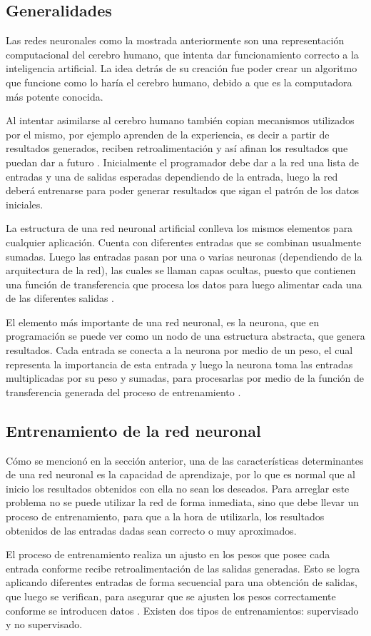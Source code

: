 \subsection{Generalidades}
\par
Las redes neuronales como la mostrada anteriormente son una representación computacional del cerebro humano, que intenta dar funcionamiento correcto a la inteligencia artificial. La idea detrás de su creación fue poder crear un algoritmo que funcione como lo haría el cerebro humano, debido a que es la computadora más potente conocida.
\par
Al intentar asimilarse al cerebro humano también copian mecanismos utilizados por el mismo, por ejemplo aprenden de la experiencia, es decir a partir de resultados generados, reciben retroalimentación y así afinan los resultados que puedan dar a futuro \cite{olabe_2008}. Inicialmente el programador debe dar a la red una lista de entradas y una de salidas esperadas dependiendo de la entrada, luego la red deberá entrenarse para poder generar resultados que sigan el patrón de los datos iniciales.
\par
La estructura de una red neuronal artificial conlleva los mismos elementos para cualquier aplicación. Cuenta con diferentes entradas que se combinan usualmente sumadas. Luego las entradas pasan por una o varias neuronas (dependiendo de la arquitectura de la red), las cuales se llaman capas ocultas, puesto que contienen una función de transferencia que procesa los datos para luego alimentar cada una de las diferentes salidas \cite{olabe_2008}.
\par
El elemento más importante de una red neuronal, es la neurona, que en programación se puede ver como un nodo de una estructura abstracta, que genera resultados. Cada entrada se conecta a la neurona por medio de un peso, el cual representa la importancia de esta entrada y luego la neurona toma las entradas multiplicadas por su peso y sumadas, para procesarlas por medio de la función de transferencia generada del proceso de entrenamiento \cite{olabe_2008}.

\subsection{Entrenamiento de la red neuronal}
Cómo se mencionó en la sección anterior, una de las características determinantes de una red neuronal es la capacidad de aprendizaje, por lo que es normal que al inicio los resultados obtenidos con ella no sean los deseados. Para arreglar este problema no se puede utilizar la red de forma inmediata, sino que debe llevar un proceso de entrenamiento, para que a la hora de utilizarla, los resultados obtenidos de las entradas dadas sean correcto o muy aproximados.
\par
El proceso de entrenamiento realiza un ajusto en los pesos que posee cada entrada conforme recibe retroalimentación de las salidas generadas. Esto se logra aplicando diferentes entradas de forma secuencial para una obtención de salidas, que luego se verifican, para asegurar que se ajusten los pesos correctamente conforme se introducen datos \cite{olabe_2008}. Existen dos tipos de entrenamientos: supervisado y no supervisado.
